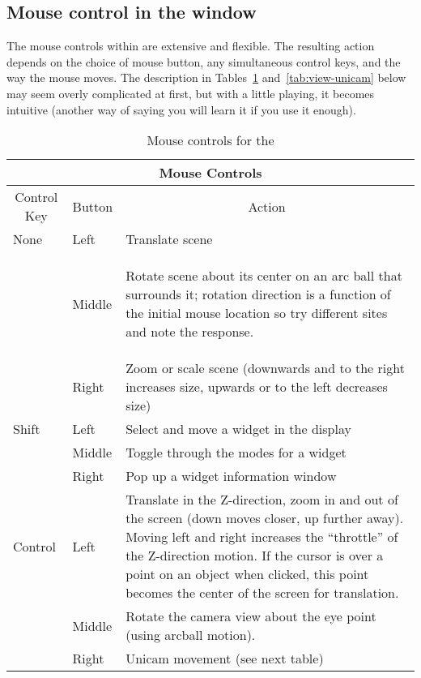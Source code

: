\subsection{Mouse control in the \viewer{} window}
\label{sec:view-mouse} 

The mouse controls within \SR{} are extensive and flexible.  The resulting
action depends on the choice of mouse button, any simultaneous control
keys, and the way the mouse moves.  The description in
Tables~\ref{tab:view-mouse} and~\ref{tab:view-unicam} below may seem overly
complicated at first, but with a little playing, it becomes intuitive
(another way of saying you will learn it if you use it enough).

\begin{table}[htb]
\begin{center}
  \begin{tabular}{|l|l|p{5in}|} \hline
    \multicolumn{3}{|c|}{\large Mouse Controls}\\ \hline \hline 
    \multicolumn{1}{|c|}{Control Key} & 
    \multicolumn{1}{|c|}{Button} & 
    \multicolumn{1}{|c|}{Action}\\ \hline
None & Left & Translate scene \\
     & Middle & \begin{raggedleft} Rotate scene about its center on an arc
    ball that surrounds it; rotation direction is a function of the
    initial mouse location so try different sites and note the
    response. \end{raggedleft}\\  
     & Right & Zoom or scale scene (downwards and to the right increases
     size, upwards or to the left decreases size) \\ \hline
Shift & Left & Select and move a widget in the display \\
      & Middle & Toggle through the modes for a widget \\
      & Right & Pop up a widget information window \\ \hline
Control & Left & Translate in the Z-direction, \ie{} zoom in and out of the
    screen (down moves closer, up further away).  Moving left and
    right increases the ``throttle'' of the Z-direction motion.  If
    the cursor is over a point on an object when clicked, this point
    becomes the center of the screen for translation.\\ 
      & Middle & Rotate the camera view about the eye point (using arcball
    motion). \\ 
      & Right & Unicam movement (see next table)\\ \hline
\end{tabular}
\caption{\label{tab:view-mouse} Mouse controls for the \viewer{}}
\end{center}
\end{table}

